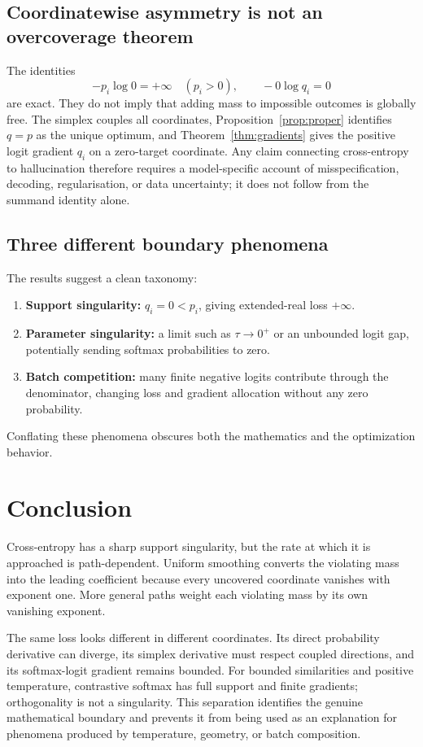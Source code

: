 \documentclass[11pt,a4paper]{article}
\theoremstyle{definition}
\theoremstyle{remark}
\begin{document}
\subsection{Coordinatewise asymmetry is not an overcoverage theorem}

The identities
\[
  -p_i\log0=+\infty\quad(p_i>0),
  \qquad
  -0\log q_i=0
\]
are exact.
They do not imply that adding mass to impossible outcomes is globally free.
The simplex couples all coordinates, Proposition~\ref{prop:proper} identifies $q=p$ as the unique optimum, and Theorem~\ref{thm:gradients} gives the positive logit gradient $q_i$ on a zero-target coordinate.
Any claim connecting cross-entropy to hallucination therefore requires a model-specific account of misspecification, decoding, regularisation, or data uncertainty; it does not follow from the summand identity alone.

\subsection{Three different boundary phenomena}

The results suggest a clean taxonomy:
\begin{enumerate}[label=(\roman*)]
  \item \textbf{Support singularity:} $q_i=0<p_i$, giving extended-real loss $+\infty$.
  \item \textbf{Parameter singularity:} a limit such as $\tau\to0^+$ or an unbounded logit gap, potentially sending softmax probabilities to zero.
  \item \textbf{Batch competition:} many finite negative logits contribute through the denominator, changing loss and gradient allocation without any zero probability.
\end{enumerate}
Conflating these phenomena obscures both the mathematics and the optimization behavior.

\section{Conclusion}

Cross-entropy has a sharp support singularity, but the rate at which it is approached is path-dependent.
Uniform smoothing converts the violating mass into the leading coefficient because every uncovered coordinate vanishes with exponent one.
More general paths weight each violating mass by its own vanishing exponent.

The same loss looks different in different coordinates.
Its direct probability derivative can diverge, its simplex derivative must respect coupled directions, and its softmax-logit gradient remains bounded.
For bounded similarities and positive temperature, contrastive softmax has full support and finite gradients; orthogonality is not a singularity.
This separation identifies the genuine mathematical boundary and prevents it from being used as an explanation for phenomena produced by temperature, geometry, or batch composition.
\end{document}
